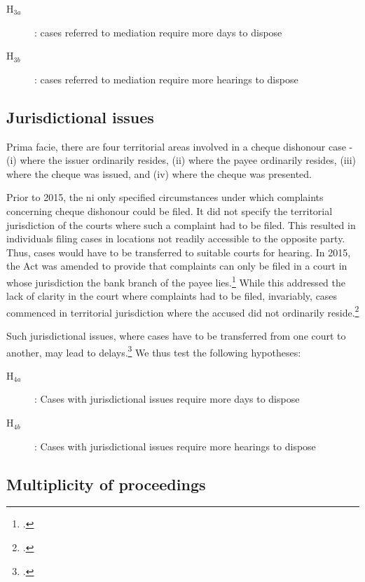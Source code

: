 \documentclass[12pt,a4paper]{article}
\begin{document}
\begin{description}
\item[H$_{3a}$]: cases referred to mediation require more days to dispose
\item[H$_{3b}$]: cases referred to mediation require more hearings to dispose
\end{description}

\subsection{Jurisdictional issues}

Prima facie, there are four territorial areas involved in a cheque dishonour case - (i) where the issuer ordinarily resides, (ii) where the payee ordinarily resides, (iii) where the cheque was issued, and (iv) where the cheque was presented. 

Prior to 2015, the \gls{ni} only specified circumstances under which complaints concerning cheque dishonour could be filed. It did not specify the territorial jurisdiction of the courts where such a complaint had to be filed. This resulted in individuals filing cases in locations not readily accessible to the opposite party. Thus, cases would have to be transferred to suitable courts for hearing. In 2015, the Act was amended to provide that complaints can only be filed in a court in whose jurisdiction the bank branch of the payee lies.\footcite{niAmend2015} While this addressed the lack of clarity in the court where complaints had to be filed, invariably, cases commenced in territorial jurisdiction where the accused did not ordinarily reside.\footcite{amicus2020_submission}

Such jurisdictional issues, where cases have to be transferred from one court to another, may lead to delays.\footcite{sc2020_138, amicus2020_submission} We thus test the following hypotheses:

\begin{description}
\item[H$_{4a}$]: Cases with jurisdictional issues require more days to dispose
\item[H$_{4b}$]: Cases with jurisdictional issues require more hearings to dispose
\end{description}

\subsection{Multiplicity of proceedings}
\end{document}
